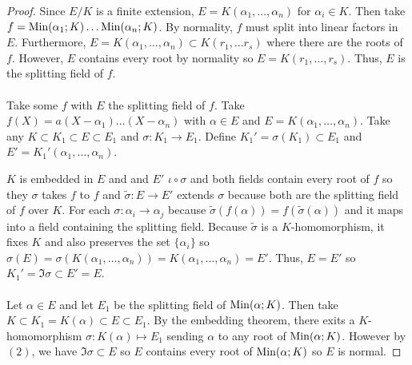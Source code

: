 \documentclass[12pt]{extarticle}
\begin{document}
\begin{proof}
Since $E/K$ is a finite extension, $E = K(\alpha_1, \dots, \alpha_n)$ for $\alpha_i \in K$. Then take $f = \mathrm{Min}(\alpha_1;K) \dots \mathrm{Min}(\alpha_n;K)$. By normality, $f$ must split into linear factors in $E$. Furthermore, $E = K(\alpha_1, \dots, \alpha_n) \subset K(r_1, \dots r_s)$ where there are the roots of $f$. However, $E$ contains every root by normality so $E = K(r_1, \dots, r_s)$. Thus, $E$ is the splitting field of $f$. \\\\
Take some $f$ with $E$ the splitting field of $f$. Take $f(X) = a(X - \alpha_1) \dots (X - \alpha_n)$ with $\alpha \in E$ and $E = K(\alpha_1, \dots, \alpha_n)$. Take any $K \subset K_1 \subset E \subset E_1$ and $\sigma : K_1 \to E_1$. Define $K_1' = \sigma(K_1) \subset E_1$ and $E' = K_1'(\alpha_1, \dots, \alpha_n)$.

\begin{center}
\end{center}
$K$ is embedded in $E$ and and $E'$  $\iota \circ \sigma$ and both fields contain every root of $f$ so they 
$\sigma$ takes $f$ to $f$ and $\tilde{\sigma} : E \to E'$ extends $\sigma$ because both are the splitting field of $f$ over $K$. For each $\sigma : \alpha_i \to \alpha_j$ because $\tilde{\sigma}(f(\alpha)) = f(\tilde{\sigma}(\alpha))$ and it maps into a field containing the splitting field. Because $\tilde{\sigma}$ is a $K$-homomorphism, it fixes $K$ and also preserves the set $\{\alpha_i\}$ so $\sigma(E) = \sigma(K(\alpha_1, \dots, \alpha_n)) = K(\alpha_1, \dots, \alpha_n) = E'$. Thus, $E = E'$ so $K_1' = \Im{\sigma} \subset E' = E$. \\\\
Let $\alpha \in E$ and let $E_1$ be the splitting field of $\mathrm{Min}(\alpha;K)$. Then take $K \subset K_1 = K(\alpha) \subset E \subset E_1$. By the embedding theorem, there exits a $K$-homomorphism $\sigma : K(\alpha) \mapsto E_1$ sending $\alpha$ to any root of $\mathrm{Min}(\alpha;K)$. However by $(2)$, we have $\Im{\sigma} \subset E$ so $E$ contains every root of $\mathrm{Min}(\alpha;K)$ so $E$ is normal. 
\end{proof}
\end{document}
